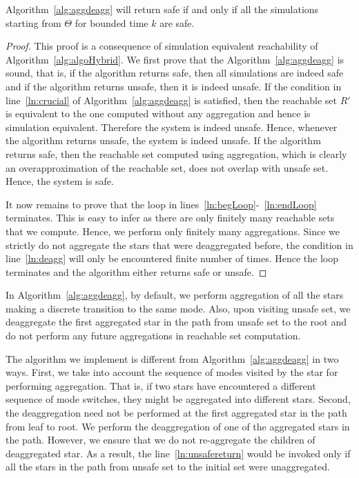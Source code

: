\begin{lemma}
Algorithm~\ref{alg:aggdeagg} will return safe if and only if all the simulations starting from $\Theta$ for bounded time $k$ are safe.
\end{lemma}
\begin{proof}
This proof is a consequence of simulation equivalent reachability of Algorithm~\ref{alg:algoHybrid}. 
%
We first prove that the Algorithm~\ref{alg:aggdeagg} is sound, that is, if the algorithm returns safe, then all simulations are indeed safe and if the algorithm returns unsafe, then it is indeed unsafe. 
%
If the condition in line~\ref{ln:crucial} of Algorithm~\ref{alg:aggdeagg} is satisfied, then the reachable set $R'$ is equivalent to the one computed without any aggregation and hence is simulation equivalent. 
%
Therefore the system is indeed unsafe. 
%
Hence, whenever the algorithm returns unsafe, the system is indeed unsafe. 
%
If the algorithm returns safe, then the reachable set computed using aggregation, which is clearly an overapproximation of the reachable set, does not overlap with unsafe set. 
%
Hence, the system is safe. 


It now remains to prove that the loop in lines~\ref{ln:begLoop}-~\ref{ln:endLoop} terminates. 
%
This is easy to infer as there are only finitely many reachable sets that we compute. 
%
Hence, we perform only finitely many aggregations. 
%
Since we strictly do not aggregate the stars that were deaggregated before, the condition in line~\ref{ln:deagg} will only be encountered finite number of times. 
%
Hence the loop terminates and the algorithm either returns safe or unsafe.
\end{proof}


\begin{remark}
\label{rem:aggonly}
In Algorithm~\ref{alg:aggdeagg}, by default, we perform aggregation of all the stars making a discrete transition to the same mode. Also, upon visiting unsafe set, we deaggregate the first aggregated star in the path from unsafe set to the root and do not perform any future aggregations in reachable set computation. 

The algorithm we implement is different from Algorithm~\ref{alg:aggdeagg} in two ways. First, we take into account the sequence of modes visited by the star for performing aggregation. That is, if two stars have encountered a different sequence of mode switches, they might be aggregated into different stars. Second, the deaggregation need not be performed at the first aggregated star in the path from leaf to root. We perform the deaggregation of one of the aggregated stars in the path. However, we ensure that we do not re-aggregate the children of deaggregated star. As a result, the line~\ref{ln:unsafereturn} would be invoked only if all the stars in the path from unsafe set to the initial set were unaggregated.
\end{remark}

